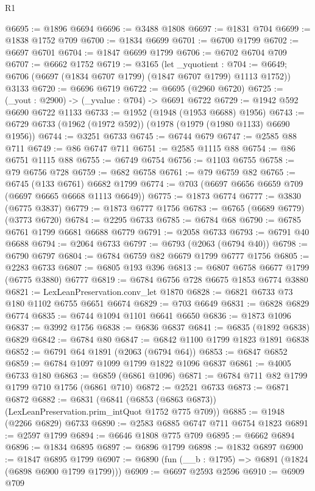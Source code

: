 \begin{lexlean}{R1}
\begin{coremodule}
@6695 := @1896 @6694
@6696 := @3488 @1808
@6697 := @1831 @704
@6699 := @1838 @1752 @709
@6700 := @1834 @6699
@6701 := @6700 @1799
@6702 := @6697 @6701
@6704 := @1847 @6699 @1799
@6706 := @6702 @6704 @709
@6707 := @6662 @1752
@6719 := @3165
    (let _yquotient : @704 := @6649;
    @6706 (@6697 (@1834 @6707 @1799) (@1847 @6707 @1799) @1113 @1752))
    @3133
@6720 := @6696 @6719
@6722 := @6695 (@2960 @6720)
@6725 := (_yout : @2900) -> (_yvalue : @704) -> @6691 @6722
@6729 := @1942 @592 @6690 @6722 @1133
@6733 := @1952 (@1948 (@1953 @6688) @1956)
@6743 := @6729 @6733 (@1962 (@1972 @592)) (@1978 (@1979 (@1980 @1133) @6690 @1956))
@6744 := @3251 @6733
@6745 := @6744 @679
@6747 := @2585 @88 @711
@6749 := @86 @6747 @711
@6751 := @2585 @1115 @88
@6754 := @86 @6751 @1115 @88
@6755 := @6749 @6754
@6756 := @1103 @6755
@6758 := @79 @6756 @728
@6759 := @682 @6758
@6761 := @79 @6759 @82
@6765 := @6745 (@133 @6761) @6682 @1799
@6774 := @703 (@6697 @6656 @6659 @709 (@6697 @6665 @6668 @1113 @6649))
@6775 := @1873 @6774
@6777 := @3830 (@6775 @3837)
@6779 := @1873 @6777 @1756
@6783 := @6765 (@6689 @6779) (@3773 @6720)
@6784 := @2295 @6733
@6785 := @6784 @68
@6790 := @6785 @6761 @1799 @6681 @6688 @6779
@6791 := @2058 @6733
@6793 := @6791 @40 @6688
@6794 := @2064 @6733
@6797 := @6793 (@2063 (@6794 @40))
@6798 := @6790 @6797
@6804 := @6784 @6759 @82 @6679 @1799 @6777 @1756
@6805 := @2283 @6733
@6807 := @6805 @193 @396
@6813 := @6807 @6758 @6677 @1799 (@6775 @3880) @6777
@6819 := @6784 @6756 @728 @6675 @1853 @6774 @3880
@6821 := LexLeanPreservation.conv_let @1870
@6828 := @6821 @6733 @73 @180 @1102 @6755 @6651 @6674
@6829 := @703 @6649
@6831 := @6828 @6829 @6774
@6835 := @6744 @1094 @1101 @6641 @6650
@6836 := @1873 @1096
@6837 := @3992 @1756
@6838 := @6836 @6837
@6841 := @6835 (@1892 @6838) @6829
@6842 := @6784 @80
@6847 := @6842 @1100 @1799 @1823 @1891 @6838
@6852 := @6791 @64 @1891 (@2063 (@6794 @64))
@6853 := @6847 @6852
@6859 := @6784 @1097 @1099 @1799 @1822 @1096 @6837
@6861 := @4005 @6733 @180
@6863 := @6859 (@6861 @1096)
@6871 := @6784 @711 @82 @1799 @1799 @710 @1756 (@6861 @710)
@6872 := @2521 @6733
@6873 := @6871 @6872
@6882 := @6831 (@6841 (@6853 (@6863 @6873)) (LexLeanPreservation.prim_intQuot @1752 @775 @709))
@6885 := @1948 (@2266 @6829) @6733
@6890 := @2583 @6885 @6747 @711 @6754 @1823
@6891 := @2597 @1799
@6894 := @6646 @1808 @775 @709
@6895 := @6662 @6894
@6896 := @1834 @6895
@6897 := @6896 @1799
@6898 := @1832 @6897
@6900 := @1847 @6895 @1799
@6907 := @6890 (fun (__b : @1795) => @6891 (@1824 (@6898 @6900 @1799 @1799)))
@6909 := @6697 @2593 @2596
@6910 := @6909 @709

\end{coremodule}
\end{lexlean}
